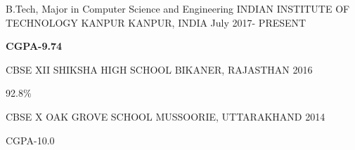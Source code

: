 

\begin{cventries}

  \cventry
    {B.Tech, Major in Computer Science and Engineering} %
    {INDIAN INSTITUTE OF TECHNOLOGY KANPUR} %
    {KANPUR, INDIA} %
    {July 2017- PRESENT} %
    {
      \begin{cvitems} %
        \item {\textbf{CGPA-9.74}}
      \end{cvitems}
    }

  \cventry
    {CBSE XII} %
    {SHIKSHA HIGH SCHOOL} %
    {BIKANER, RAJASTHAN} %
    {2016} %
    {
      \begin{cvitems} %
        \item {92.8\%}
      \end{cvitems}
    }

  \cventry
    {CBSE X} %
    {OAK GROVE SCHOOL} %
    {MUSSOORIE, UTTARAKHAND} %
    {2014} %
    {
      \begin{cvitems} %
        \item {CGPA-10.0}
      \end{cvitems}
    }



\end{cventries}
